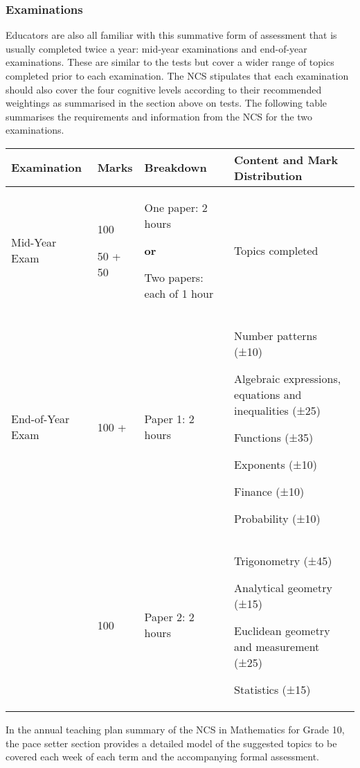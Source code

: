 \subsubsection{Examinations}
Educators are also all familiar with this summative form of assessment that is usually completed twice a year: mid-year examinations and end-of-year examinations. These are similar to the tests but cover a wider range of topics completed prior to each examination. The NCS stipulates that each examination should also cover the four cognitive levels according to their recommended weightings as summarised in the section above on tests. The following table summarises the requirements and information from the NCS for the two examinations.

\begin{table}[H]
\begin{center}
\begin{tabular} {|p{2cm}|p{1.5cm}|p{3cm}|p{4.5cm}|} \hline
\textbf{Examination}	 	 & \textbf{Marks}			& \textbf{Breakdown} 			& \textbf{Content and Mark Distribution} \\ \hline
Mid-Year Exam & 100 \par 50 + 50 & One paper: 2 hours\par \textbf{or} \par
				    Two papers: each of 1 hour  	& Topics completed\\ \hline
End-of-Year Exam		& 100 + & Paper 1: 2 hours	& Number patterns (±10) \par 
Algebraic expressions, equations and inequalities (±25)\par 
Functions (±35)\par 
Exponents (±10)\par 
Finance (±10)\par 
Probability (±10)
 \\ \hline
			&100  & Paper 2: 2 hours	& Trigonometry (±45) \par 
Analytical geometry (±15)\par 
Euclidean geometry and measurement (±25)\par 
Statistics (±15)
 \\ \hline

\end{tabular}
 \end{center}
\end{table}

In the annual teaching plan summary of the NCS in Mathematics for Grade 10, the pace setter section provides a detailed model of the suggested topics to be covered each week of each term and the accompanying formal assessment.

